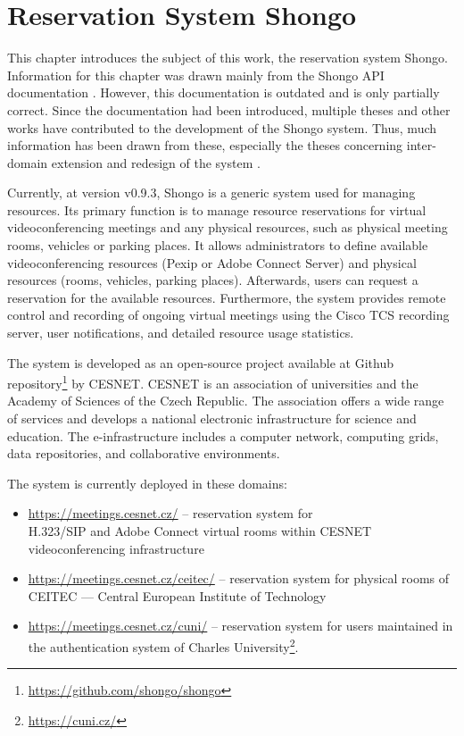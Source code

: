 \chapter{Reservation System Shongo}
This chapter introduces the subject of this work, the reservation system Shongo.
Information for this chapter was drawn mainly from the Shongo API documentation  \cite{shongoapi}. However, this documentation is outdated and is only partially correct. Since the documentation had been introduced, multiple theses and other works have contributed to the development of the Shongo system. Thus, much information has been drawn from these, especially the theses concerning inter-domain extension \cite{pavelka2016shongo} and redesign of the system \cite{perichta2020}.

Currently, at version v0.9.3, Shongo is a generic system used for managing resources.
Its primary function is to manage resource reservations for virtual videoconferencing meetings and any physical resources, such as physical meeting rooms, vehicles or parking places.
It allows administrators to define available videoconferencing resources (Pexip or Adobe Connect Server) and physical resources (rooms, vehicles, parking places). Afterwards, users can request a reservation for the available resources.
Furthermore, the system provides remote control and recording of ongoing virtual meetings using the Cisco TCS recording server, user notifications, and detailed resource usage statistics.
\cite{shongo}

The system is developed as an open-source project available at Github repository\footnote{\url{https://github.com/shongo/shongo}} by CESNET.
CESNET is an association of universities and the Academy of Sciences of the Czech Republic. The association offers a wide range of services and develops a national electronic infrastructure for science and education. The e-infrastructure includes a computer network, computing grids, data repositories, and collaborative environments. \cite{cesnet}

The system is currently deployed in these domains:
\begin{itemize}
    \item \url{https://meetings.cesnet.cz/} -- reservation system for \\
    H.323/SIP and Adobe Connect virtual rooms within CESNET videoconferencing infrastructure
    \item \url{https://meetings.cesnet.cz/ceitec/} -- reservation system for physical rooms of CEITEC --- Central European Institute of Technology
    \item \url{https://meetings.cesnet.cz/cuni/} -- reservation system for users maintained in the authentication system of Charles University\footnote{\url{https://cuni.cz/}}.
\end{itemize}

